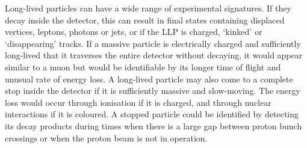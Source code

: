 Long-lived particles can have a wide range of experimental signatures. If they 
decay inside the detector, this can result in final states containing displaced 
vertices, leptons, photons or jets, or if the LLP is charged, `kinked' or 
`disappearing' tracks. 
If a massive particle is electrically charged and sufficiently long-lived that 
it traverses the entire detector without decaying, it would appear similar to a 
muon but would be identifiable by its longer time of flight and unusual rate of 
energy loss.
A long-lived particle may also come to a complete stop inside the detector if 
it is sufficiently massive and slow-moving. The energy loss would occur through 
ionisation if it is charged, and through nuclear interactions if it is 
coloured. A stopped particle could be identified by detecting its decay 
products during times when there is a large gap between proton bunch crossings 
or when the proton beam is not in operation.

